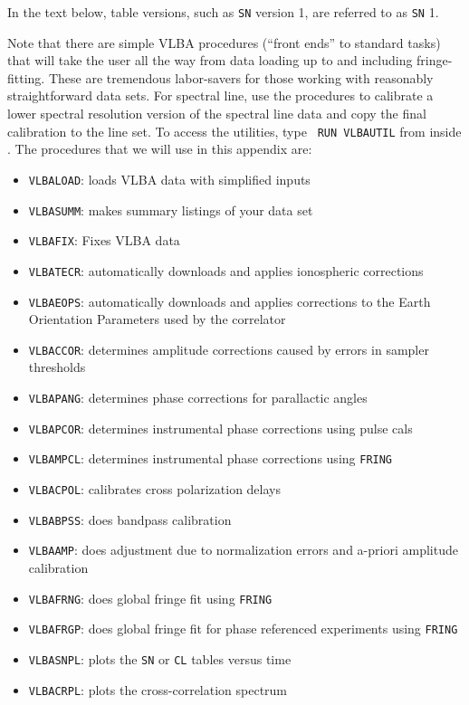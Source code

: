 In the text below, table versions, such as {\tt SN} version 1, are
referred to as {\tt SN} 1.


Note that there are simple VLBA procedures (``front ends'' to standard
tasks) that will take the user all the way from data loading up to and
including fringe-fitting.  These are tremendous
labor-savers for those working with reasonably straightforward data
sets.  For spectral line, use the procedures to calibrate a lower
spectral resolution version of the spectral line data and copy the
final calibration to the line set.  To access the utilities, type {\tt
RUN VLBAUTIL} from inside \AIPS\@.  The
procedures that we will use in this appendix are:

\begin{itemize}
\item {{\tt VLBALOAD}: loads VLBA data with simplified inputs}
\item {{\tt VLBASUMM}: makes summary listings of your data set}
\item {{\tt VLBAFIX}: Fixes VLBA data}
\item {{\tt VLBATECR}: automatically downloads and applies ionospheric
           corrections}
\item {{\tt VLBAEOPS}: automatically downloads and applies corrections
           to the Earth Orientation Parameters used by the
           correlator}
\item {{\tt VLBACCOR}: determines amplitude corrections caused by
           errors in sampler thresholds}
\item {{\tt VLBAPANG}: determines phase corrections for parallactic
           angles}
\item {{\tt VLBAPCOR}: determines instrumental phase corrections using
           pulse cals}
\item {{\tt VLBAMPCL}: determines instrumental phase corrections using
           {\tt FRING}}
\item {{\tt VLBACPOL}: calibrates cross polarization delays}
\item {{\tt VLBABPSS}: does bandpass calibration }
\item {{\tt VLBAAMP}: does adjustment due to normalization errors and
            a-priori amplitude calibration }
\item {{\tt VLBAFRNG}: does global fringe fit using {\tt FRING}}
\item {{\tt VLBAFRGP}: does global fringe fit for phase referenced
           experiments using {\tt FRING}}
\item {{\tt VLBASNPL}: plots the {\tt SN} or {\tt CL} tables versus
           time}
\item {{\tt VLBACRPL}: plots the cross-correlation spectrum}
\end{itemize}

